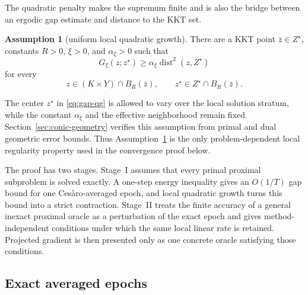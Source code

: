 \documentclass[letterpaper]{article} %
\theoremstyle{definition}
\newtheorem{assumption}[theorem]{Assumption}
\theoremstyle{remark}
\begin{document}
The quadratic penalty makes the supremum finite and is also the bridge
between an ergodic gap estimate and distance to the KKT set.

\begin{assumption}[uniform local quadratic growth]
\label{ass:smoothed-qg}
There are a KKT point $\bar z\in Z^\star$, constants $R>0$, $\xi>0$, and
$\alpha_\xi>0$ such that
\begin{equation}
\label{eq:gap-qg}
    G_\xi(z;z^\star)
    \ge
    \alpha_\xi\operatorname{dist}^2(z,Z^\star)
\end{equation}
for every
\[
    z\in(K\times Y)\cap B_R(\bar z),
    \qquad
    z^\star\in Z^\star\cap B_R(\bar z).
\]
\end{assumption}

The center $z^\star$ in \eqref{eq:gap-qg} is allowed to vary over the local
solution stratum, while the constant $\alpha_\xi$ and the effective
neighborhood remain fixed.  Section~\ref{sec:conic-geometry} verifies this
assumption from primal and dual geometric error bounds.  Thus
Assumption~\ref{ass:smoothed-qg} is the only problem-dependent local
regularity property used in the convergence proof below.

The proof has two stages.  Stage~I assumes that every primal proximal
subproblem is solved exactly.  A one-step energy inequality gives an
$O(1/T)$ gap bound for one Ces\`aro-averaged epoch, and local quadratic
growth turns this bound into a strict contraction.  Stage~II treats the
finite accuracy of a general inexact proximal oracle as a perturbation of the
exact epoch and gives method-independent conditions under which the same
local linear rate is retained.  Projected gradient is then presented only as
one concrete oracle satisfying those conditions.

\subsection{Exact averaged epochs}
\end{document}
